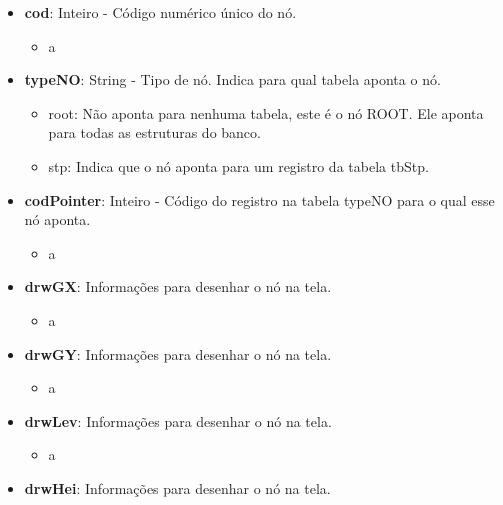 \begin{itemize}
	\item \textbf{cod}: Inteiro - Código numérico único do nó.
			\begin{itemize}
				\item a
			\end{itemize}

	\item \textbf{typeNO}: String - Tipo de nó. Indica para qual tabela aponta o nó.
			\begin{itemize}
				\item root: Não aponta para nenhuma tabela, este é o nó ROOT. Ele aponta para todas as estruturas do banco.
				\item stp: Indica que o nó aponta para um registro da tabela tbStp.
			\end{itemize}
	\item \textbf{codPointer}: Inteiro - Código do registro na tabela typeNO para o qual esse nó aponta.
			\begin{itemize}
				\item a
			\end{itemize}
	\item \textbf{drwGX}: Informações para desenhar o nó na tela.
			\begin{itemize}
				\item a
			\end{itemize}
	\item \textbf{drwGY}: Informações para desenhar o nó na tela.
			\begin{itemize}
				\item a
			\end{itemize}
	\item \textbf{drwLev}: Informações para desenhar o nó na tela.
			\begin{itemize}
				\item a
			\end{itemize}
	\item \textbf{drwHei}: Informações para desenhar o nó na tela.

\end{itemize}
